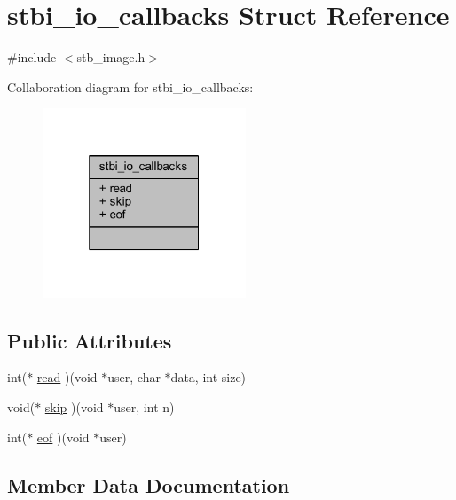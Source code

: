 \hypertarget{structstbi__io__callbacks}{}\section{stbi\+\_\+io\+\_\+callbacks Struct Reference}
\label{structstbi__io__callbacks}


{\ttfamily \#include $<$stb\+\_\+image.\+h$>$}



Collaboration diagram for stbi\+\_\+io\+\_\+callbacks\+:
\nopagebreak
\begin{figure}[H]
\begin{center}
\leavevmode
\includegraphics[width=172pt]{structstbi__io__callbacks__coll__graph}
\end{center}
\end{figure}
\subsection*{Public Attributes}
\begin{DoxyCompactItemize}
\item 
int($\ast$ \mbox{\hyperlink{structstbi__io__callbacks_a623e46b3a2a019611601409926283a88}{read}} )(void $\ast$user, char $\ast$data, int size)
\item 
void($\ast$ \mbox{\hyperlink{structstbi__io__callbacks_a257aac5480a90a6c4b8fbe86c1b01068}{skip}} )(void $\ast$user, int n)
\item 
int($\ast$ \mbox{\hyperlink{structstbi__io__callbacks_a319639db2f76e715eed7a7a974136832}{eof}} )(void $\ast$user)
\end{DoxyCompactItemize}


\subsection{Member Data Documentation}
\mbox{\label{structstbi__io__callbacks_a319639db2f76e715eed7a7a974136832}} 
